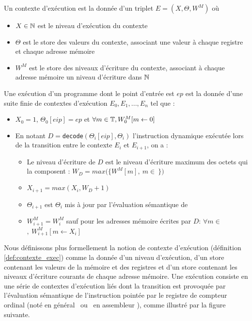\begin{defi}
Un contexte d'exécution est la donnée d'un triplet $E=(X, \Theta, W^M)$ où
\begin{itemize}
 \item $X\in\mathbb N$ est le niveau d'exécution du contexte
 \item $\Theta$ est le store des valeurs du contexte, associant une valeur à chaque registre et chaque adresse mémoire
 \item $W^M$ est le store des niveaux d'écriture du contexte, associant à chaque adresse mémoire un niveau d'écriture dans $\mathbb N$
\end{itemize}
Une exécution d'un programme dont le point d'entrée est $ep$ est la donnée d'une suite finie de contextes d'exécution $E_0, E_1, ..., E_n$ tel que :
\begin{itemize}
 \item $X_0=1$, $\Theta_0[eip]=ep$ et $\forall m\in \mathbb T, W_0^M[m\leftarrow 0]$
 \item En notant $D=$\texttt{decode}$(\Theta_i[eip], \Theta_i)$ l'instruction dynamique exécutée lors de la transition entre le contexte $E_i$ et $E_{i+1}$, on a :
    \begin{itemize}
     \item Le niveau d'écriture de $D$ est le niveau d'écriture maximum des octets qui la composent : $W_D=max(\{W^M[m],\ m\in\ $$\})$
     \item $X_{i+1}=max(X_i, W_D+1)$
     \item $\Theta_{i+1}$ est $\Theta_i$ mis à jour par l'évaluation sémantique de 
     \item $W_{i+1}^M=W_{i}^M$ sauf pour les adresses mémoire écrites par $D$: $\forall m\in\ $$,\ W_{i+1}^M[m\leftarrow X_i]$
    \end{itemize}
\end{itemize}
\label{def:contexte_exec}
\end{defi}

Nous définissons plus formellement la notion de contexte d'exécution (définition \ref{def:contexte_exec}) comme la donnée d'un niveau d'exécution, d'un store contenant les valeurs de la mémoire et des registres et d'un store contenant les niveaux d'écriture courants de chaque adresse mémoire. 
Une exécution consiste en une série de contextes d'exécution liés dont la transition est provoquée par l'évaluation sémantique de l'instruction pointée par le registre de compteur ordinal (noté en général \pc\ ou \eax\ en assembleur \xq), comme illustré par la figure suivante.

